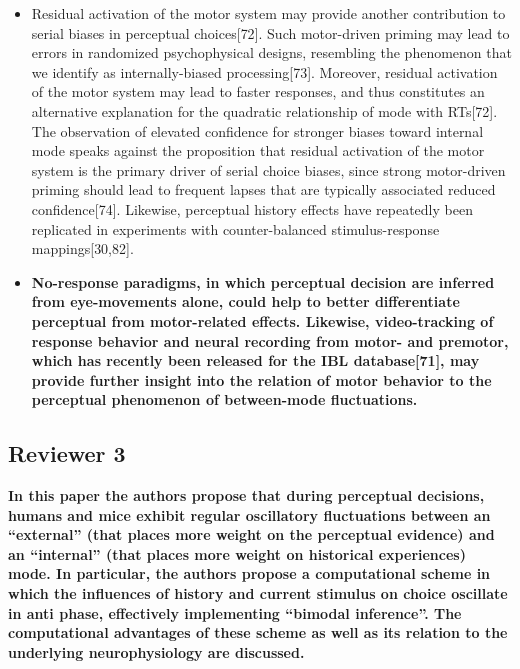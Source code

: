 \documentclass[
]{article}
\begin{document}
\begin{itemize}
\item
  Residual activation of the motor system may provide another
  contribution to serial biases in perceptual choices{[}72{]}. Such
  motor-driven priming may lead to errors in randomized psychophysical
  designs, resembling the phenomenon that we identify as
  internally-biased processing{[}73{]}. Moreover, residual activation of
  the motor system may lead to faster responses, and thus constitutes an
  alternative explanation for the quadratic relationship of mode with
  RTs{[}72{]}. The observation of elevated confidence for stronger
  biases toward internal mode speaks against the proposition that
  residual activation of the motor system is the primary driver of
  serial choice biases, since strong motor-driven priming should lead to
  frequent lapses that are typically associated reduced
  confidence{[}74{]}. Likewise, perceptual history effects have
  repeatedly been replicated in experiments with counter-balanced
  stimulus-response mappings{[}30,82{]}.
\item
  \textbf{No-response paradigms, in which perceptual decision are
  inferred from eye-movements alone, could help to better differentiate
  perceptual from motor-related effects. Likewise, video-tracking of
  response behavior and neural recording from motor- and premotor, which
  has recently been released for the IBL database{[}71{]}, may provide
  further insight into the relation of motor behavior to the perceptual
  phenomenon of between-mode fluctuations.}
\end{itemize}

\hypertarget{reviewer-3}{%
\subsection{Reviewer 3}\label{reviewer-3}}

\textbf{In this paper the authors propose that during perceptual
decisions, humans and mice exhibit regular oscillatory fluctuations
between an ``external'' (that places more weight on the perceptual
evidence) and an ``internal'' (that places more weight on historical
experiences) mode. In particular, the authors propose a computational
scheme in which the influences of history and current stimulus on choice
oscillate in anti phase, effectively implementing ``bimodal inference''.
The computational advantages of these scheme as well as its relation to
the underlying neurophysiology are discussed.}
\end{document}
